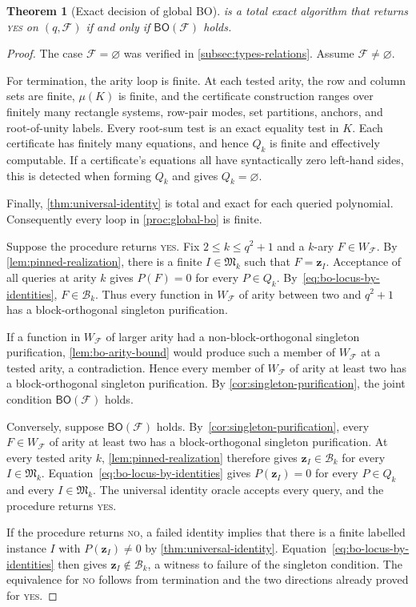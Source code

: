 \documentclass[11pt,letterpaper,onecolumn]{article}
\theoremstyle{plain}
\newtheorem{theorem}{Theorem}[section]
\theoremstyle{definition}
\theoremstyle{remark}
\newcommand{\cF}{\mathcal F}
\newcommand{\BO}{\mathsf{BO}}
\newcommand{\zvec}[1]{\mathbf z_{#1}}
\newcommand{\InstMonoid}[1]{\mathfrak M_{#1}}
\newcommand{\YES}{\textnormal{\textsc{yes}}}
\newcommand{\NO}{\textnormal{\textsc{no}}}
\begin{document}
\begin{theorem}[Exact decision of global BO]
\label{thm:global-bo-decidable}
 is a total exact algorithm that returns \YES{}
on $(q,\cF)$ if and only if $\BO(\cF)$ holds.
\end{theorem}

\begin{proof}
The case $\cF=\varnothing$ was verified in \cref{subsec:types-relations}.  Assume
$\cF\ne\varnothing$.

For termination, the arity loop is finite.  At each tested arity,
the row and column sets are
finite, $\mu(K)$ is finite, and the certificate construction ranges over
finitely many rectangle systems, row-pair modes, set partitions, anchors,
and root-of-unity labels.  Every root-sum test is an exact equality test in
$K$.  Each certificate has finitely many equations, and hence $Q_k$ is
finite and effectively computable.  If a certificate's equations all have
syntactically zero left-hand sides, this is detected when forming $Q_k$
and gives $Q_k=\varnothing$.

Finally, \cref{thm:universal-identity} is total and exact for each queried
polynomial.  Consequently every loop in \cref{proc:global-bo} is finite.

Suppose the procedure returns \YES.  Fix
$2\le k\le q^2+1$ and a $k$-ary $F\in W_{\cF}$.  By
\cref{lem:pinned-realization}, there is a finite
$I\in\InstMonoid{k}$ such that $F=\zvec I$.  Acceptance of all queries
at arity $k$ gives $P(F)=0$ for every $P\in Q_k$.
By~\eqref{eq:bo-locus-by-identities}, $F\in\mathcal B_k$.
Thus every function in $W_{\cF}$ of arity between two and $q^2+1$
has a block-orthogonal singleton purification.

If a function in $W_{\cF}$ of larger arity had a non-block-orthogonal singleton
purification, \cref{lem:bo-arity-bound} would produce such a member of
$W_{\cF}$ at a tested arity, a contradiction.  Hence every member of
$W_{\cF}$ of arity at least two has a block-orthogonal singleton
purification.  By \cref{cor:singleton-purification}, the joint condition
$\BO(\cF)$ holds.

Conversely, suppose $\BO(\cF)$ holds.  By~\cref{cor:singleton-purification},
every $F\in W_{\cF}$ of arity at
least two has a block-orthogonal singleton purification.  At every tested
arity $k$, \cref{lem:pinned-realization} therefore gives
$\zvec I\in\mathcal B_k$ for every $I\in\InstMonoid{k}$.
Equation~\eqref{eq:bo-locus-by-identities} gives $P(\zvec I)=0$
for every $P\in Q_k$ and every $I\in\InstMonoid{k}$.
The universal identity oracle accepts every query, and the procedure returns
\YES.

If the procedure returns \NO, a failed identity implies that there is a
finite labelled instance $I$ with $P(\zvec I)\ne0$ by
\cref{thm:universal-identity}.  Equation~\eqref{eq:bo-locus-by-identities}
then gives $\zvec I\notin\mathcal B_k$, a witness to failure of the
singleton condition.  The equivalence for \NO{} follows from termination
and the two directions already proved for \YES.
\end{proof}
\end{document}
